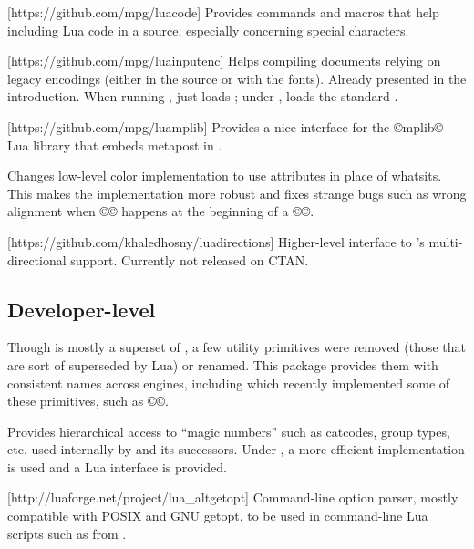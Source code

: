 \documentclass{lltxdoc}
\begin{document}
[https://github.com/mpg/luacode]
Provides commands and macros that help including Lua code in a \tex source,
especially concerning special characters.

[https://github.com/mpg/luainputenc]
Helps compiling documents relying on legacy encodings (either in the source or
with the fonts). Already presented in the introduction. When running \xetex,
just loads ; under \pdftex, loads the standard
.

[https://github.com/mpg/luamplib]
Provides a nice interface for the ©mplib© Lua library that embeds metapost in
\luatex.

Changes low-level color implementation to use \luatex attributes in place of
whatsits. This makes the implementation more robust and fixes strange bugs
such as wrong alignment when ©\color© happens at the beginning of a ©\vbox©.

[https://github.com/khaledhosny/luadirections]
Higher-level interface to \luatex's multi-directional support. Currently not
released on CTAN.

\subsection{Developer-level}

Though \luatex is mostly a superset of \pdftex, a few utility primitives were
removed (those that are sort of superseded by Lua) or renamed. This package
provides them with consistent names across engines, including \xetex which
recently implemented some of these primitives, such as ©\strcmp©.

Provides hierarchical access to ``magic numbers'' such as catcodes, group
types, etc. used internally by \tex and its successors. Under \luatex, a more
efficient implementation is used and a Lua interface is provided.

[http://luaforge.net/project/lua_altgetopt]
Command-line option parser, mostly compatible with POSIX and GNU getopt, to be
used in command-line Lua scripts such as  from
.
\end{document}
